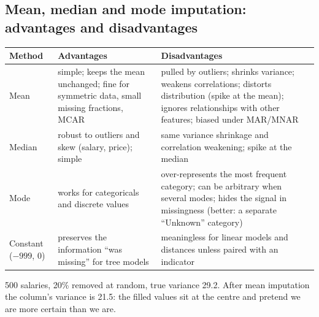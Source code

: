 \subsection{Mean, median and mode imputation: advantages and disadvantages}
\begin{center}\small
\begin{tabularx}{\linewidth}{l X X}
\toprule
Method & Advantages & Disadvantages\\
\midrule
Mean & simple; keeps the mean unchanged; fine for symmetric data, small missing fractions, MCAR & pulled by outliers; shrinks variance; weakens correlations; distorts
distribution (spike at the mean); ignores relationships with other features; biased under MAR/MNAR\\
Median & robust to outliers and skew (salary, price); simple & same variance shrinkage and correlation weakening; spike at the median\\
Mode & works for categoricals and discrete values & over-represents the most frequent category; can be arbitrary when several modes; hides the signal in
missingness (better: a separate ``Unknown'' category)\\
Constant ($-999$, 0) & preserves the information ``was missing'' for tree models & meaningless for linear models and distances unless paired with an indicator\\
\bottomrule
\end{tabularx}
\end{center}
\begin{example}
500 salaries, 20\% removed at random, true variance 29.2. After mean imputation the column's variance is 21.5: the filled values sit at the centre and pretend we are more
certain than we are.
\end{example}

